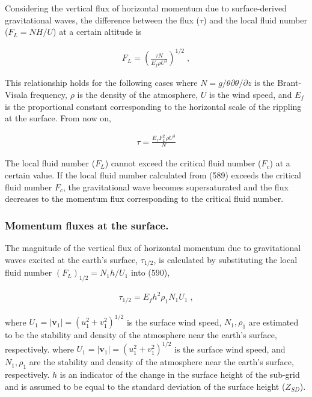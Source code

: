Considering the vertical flux of horizontal momentum due to
surface-derived gravitational waves, the difference between the flux
(\(\tau\)) and the local fluid number (\(F_L = NH/U\)) at a certain
altitude is

\begin{eqnarray}
   F_L = \left(
            \frac{\tau N}{E_f \rho U^3}
           \right)^{1/2} \; ,
\end{eqnarray}

This relationship holds for the following cases where
\(N = g/\theta \partial \theta/\partial z\) is the Brant-Visala
frequency, \(\rho\) is the density of the atmosphere, \(U\) is the wind
speed, and \(E_f\) is the proportional constant corresponding to the
horizontal scale of the rippling at the surface. From now on,

\begin{eqnarray}
  \tau = \frac{E_f F_L^2 \rho U^3}{N}
\end{eqnarray}

The local fluid number (\(F_L\)) cannot exceed the critical fluid number
(\(F_{c}\)) at a certain value. If the local fluid number calculated
from (589) exceeds the critical fluid number \(F_{c}\), the
gravitational wave becomes supersaturated and the flux decreases to the
momentum flux corresponding to the critical fluid number.

\hypertarget{momentum-fluxes-at-the-surface.}{%
\subsubsection{Momentum fluxes at the
surface.}\label{momentum-fluxes-at-the-surface.}}

The magnitude of the vertical flux of horizontal momentum due to
gravitational waves excited at the earth's surface, \(\tau_{1/2}\), is
calculated by substituting the local fluid number
\((F_L)_{1/2} = N_1 h/U_1\) into (590),

\begin{eqnarray}
  \tau_{1/2} = E_f h^2 \rho_1 N_1 U_1 \; ,
\end{eqnarray}

where \(U_1 = |{\mathbf v}_1| = (u_1^2 + v_1^2)^{1/2}\) is the surface
wind speed, \(N_1, \rho_1\) are estimated to be the stability and
density of the atmosphere near the earth's surface, respectively. where
\(U_1 = |{\mathbf v}_1| = (u_1^2 + v_1^2)^{1/2}\) is the surface wind
speed, and \(N_1, \rho_1\) are the stability and density of the
atmosphere near the earth's surface, respectively. \(h\) is an indicator
of the change in the surface height of the sub-grid and is assumed to be
equal to the standard deviation of the surface height (\(Z_{SD}\)).


